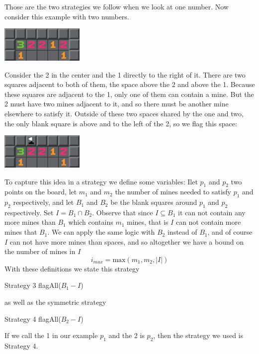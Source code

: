 \documentclass{article}
\theoremstyle{definition}
\theoremstyle{definition}
\theoremstyle{theorem}
\begin{document}
	Those are the two strategies we follow when we look at one number. Now consider this example with two numbers. 
	\begin{center}
		\includegraphics[width=0.3\textwidth]{exampleimages/example2a}
	\end{center}
	Consider the 2 in the center and the 1 directly to the right of it. There are two squares adjacent to both of them, the space above the 2 and above the 1. Because these squares are adjacent to the 1, only one of them can contain a mine. But the 2 must have two mines adjacent to it, and so there must be another mine elsewhere to satisfy it. Outside of these two spaces shared by the one and two, the only blank square is above and to the left of the 2, so we flag this space:
	\begin{center}
		\includegraphics[width=0.3\textwidth]{exampleimages/example2b}
	\end{center}
	To capture this idea in a strategy we define some variables: Ilet $p_1$ and $p_2$ two points on the board, let $m_1$ and $m_2$ the number of mines needed to satisfy $p_1$ and $p_2$ respectively, and let $B_1$ and $B_2$ be the blank squares around $p_1$ and $p_2$ respectively. Set $I = B_1 \cap B_2$.  Observe that since $I \subseteq B_1$ it can not contain any more mines than $B_1$ which contains $m_1$ mines, that is $I$ can not contain more mines that $B_1$. We can apply the same logic with $B_2$ instead of $B_1$, and of course $I$ can not have more mines than spaces, and so altogether we have a bound on the number of mines in $I$
	$$i _{max} = \textrm{max}(m_1,m_2,|I|) $$
	With these definitions we state this strategy
	\begin{algorithmic}
		 \Comment Strategy 3
		\State flagAll($B_1 - I$)
		\EndIf
	\end{algorithmic}
	as well as the symmetric strategy
	\begin{algorithmic}
		 \Comment Strategy 4
		\State flagAll($B_2 - I$)
		\EndIf
	\end{algorithmic}
	If we call the 1 in our example $p_1$ and the 2 is $p_2$, then the strategy we used is Strategy 4. 
	
\end{document}
